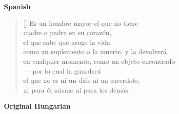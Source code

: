 \documentclass[a4paper,12pt,twoside,final]{book}
\begin{document}
\bigskip

\noindent \textbf{Spanish}


\settowidth{\versewidth}{en cualquier momento, como un objeto encontrado}

\begin{verse}[\versewidth]
  Es un hombre mayor el que no tiene \\
  madre o padre en su corazón, \\
  el que sabe que acoge la vida \\
  como un suplemento a la muerte, y la devolverá \\
  en cualquier momento, como un objeto encontrado \\
  --- por lo cual la guardará \\
  el que no es ni un diós ni un sacerdote, \\
  ni para él mismo ni para los demás. \\
\end{verse}

\newpage


\noindent \textbf{Original Hungarian}



\settowidth{\versewidth}{s mint talált tárgyat visszaadja}
\end{document}
